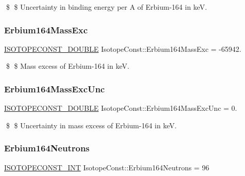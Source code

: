 \$ \$ Uncertainty in binding energy per A of Erbium-\/164 in keV. \mbox{\label{group___isotope_const-_erbium-_er164_ga6ee6b94273f3c528c70297c0423b29a0}} 
\subsubsection{\texorpdfstring{Erbium164\+Mass\+Exc}{Erbium164MassExc}}
{\footnotesize\ttfamily \mbox{\hyperlink{group___isotope_const-_macros_ga8f45a7272ce02c0b4c65c44636ed719a}{I\+S\+O\+T\+O\+P\+E\+C\+O\+N\+S\+T\+\_\+\+D\+O\+U\+B\+LE}} Isotope\+Const\+::\+Erbium164\+Mass\+Exc = -\/65942.}

\$ \$ Mass excess of Erbium-\/164 in keV. \mbox{\label{group___isotope_const-_erbium-_er164_ga78310bc65a091357883c80b4ae01da5b}} 
\subsubsection{\texorpdfstring{Erbium164\+Mass\+Exc\+Unc}{Erbium164MassExcUnc}}
{\footnotesize\ttfamily \mbox{\hyperlink{group___isotope_const-_macros_ga8f45a7272ce02c0b4c65c44636ed719a}{I\+S\+O\+T\+O\+P\+E\+C\+O\+N\+S\+T\+\_\+\+D\+O\+U\+B\+LE}} Isotope\+Const\+::\+Erbium164\+Mass\+Exc\+Unc = 0.}

\$ \$ Uncertainty in mass excess of Erbium-\/164 in keV. \mbox{\label{group___isotope_const-_erbium-_er164_gad3b479571e9c294f304fb4c79f41c9a7}} 
\subsubsection{\texorpdfstring{Erbium164\+Neutrons}{Erbium164Neutrons}}
{\footnotesize\ttfamily \mbox{\hyperlink{group___isotope_const-_macros_ga5f18360b3e99483a35c32d789e62621c}{I\+S\+O\+T\+O\+P\+E\+C\+O\+N\+S\+T\+\_\+\+I\+NT}} Isotope\+Const\+::\+Erbium164\+Neutrons = 96}

